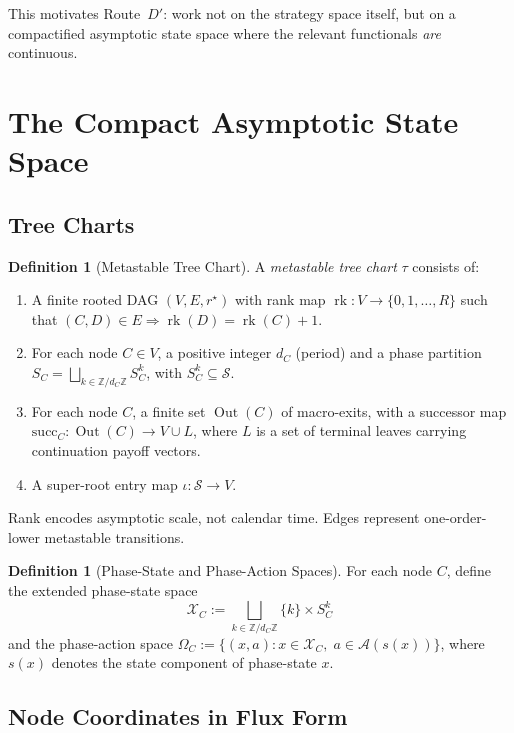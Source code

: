 \documentclass[12pt,a4paper]{article}
\theoremstyle{definition}
\newtheorem{definition}[theorem]{Definition}
\newcommand{\Z}{\mathbb{Z}}
\newcommand{\cA}{\mathcal{A}}
\newcommand{\cS}{\mathcal{S}}
\newcommand{\cX}{\mathcal{X}}
\DeclareMathOperator{\Out}{Out}
\DeclareMathOperator{\rk}{rk}
\begin{document}
This motivates Route~$D'$: work not on the strategy space itself, but on a compactified asymptotic state space where the relevant functionals \emph{are} continuous.

\section{The Compact Asymptotic State Space}
\label{sec:compact-object}

\subsection{Tree Charts}
\label{sec:tree-charts}

\begin{definition}[Metastable Tree Chart]
\label{def:tree-chart}
A \emph{metastable tree chart} $\tau$ consists of:
\begin{enumerate}[label=(\alph*)]
\item A finite rooted DAG $(V, E, r^\star)$ with rank map $\rk \colon V \to \{0, 1, \ldots, R\}$ such that $(C, D) \in E \Rightarrow \rk(D) = \rk(C) + 1$.
\item For each node $C \in V$, a positive integer $d_C$ (period) and a phase partition $S_C = \bigsqcup_{k \in \Z/d_C\Z} S_C^k$, with $S_C^k \subseteq \cS$.
\item For each node $C$, a finite set $\Out(C)$ of macro-exits, with a successor map $\mathrm{succ}_C \colon \Out(C) \to V \cup L$, where $L$ is a set of terminal leaves carrying continuation payoff vectors.
\item A super-root entry map $\iota \colon \cS \to V$.
\end{enumerate}
Rank encodes asymptotic scale, not calendar time. Edges represent one-order-lower metastable transitions.
\end{definition}

\begin{definition}[Phase-State and Phase-Action Spaces]
\label{def:phase-spaces}
For each node $C$, define the extended phase-state space
\[
\cX_C := \bigsqcup_{k \in \Z/d_C\Z} \{k\} \times S_C^k
\]
and the phase-action space $\Omega_C := \{(x, a) : x \in \cX_C,\; a \in \cA(s(x))\}$, where $s(x)$ denotes the state component of phase-state $x$.
\end{definition}

\subsection{Node Coordinates in Flux Form}
\label{sec:node-coords}
\end{document}
